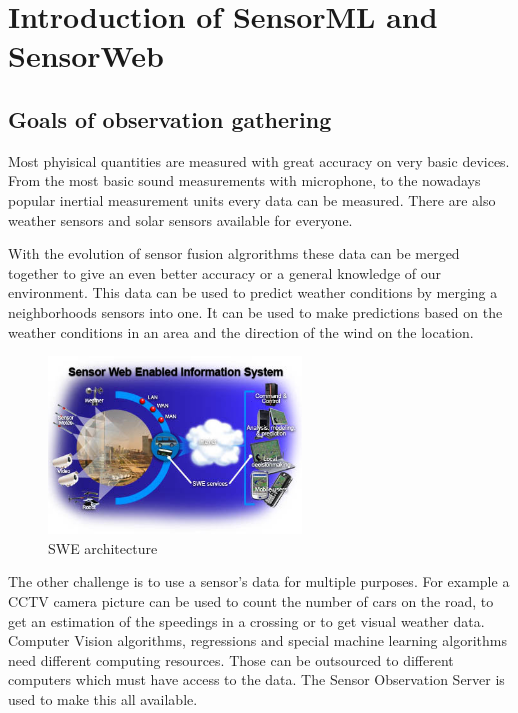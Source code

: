 \chapter{Introduction of SensorML and SensorWeb}\label{sect:Introduction}
\section{Goals of observation gathering}
Most phyisical quantities are measured with great accuracy on very basic devices. From the most basic sound measurements with microphone, to the nowadays popular inertial measurement units every data can be measured. There are also weather sensors and solar sensors available for everyone.

 With the evolution of sensor fusion algrorithms these data can be merged together to give an even better accuracy or a general knowledge of our environment. This data can be used to predict weather conditions by merging a neighborhoods sensors into one. It can be used to make predictions based on the weather conditions in an area and the direction of the wind on the location.
 
 \begin{figure}[h]
 \centering
  \includegraphics[width=0.6\textwidth]{figures/webswe.png}
 \caption{SWE architecture\label{fig:webswe}}
 \end{figure}
 
 
 The other challenge is to use a sensor's data for multiple purposes. For example a CCTV camera picture can be used to count the number of cars on the road, to get an estimation of the speedings in a crossing or to get visual weather data. Computer Vision algorithms, regressions and special machine learning algorithms need different computing resources. Those can be outsourced to different computers which must have access to the data. The Sensor Observation Server is used to make this all available.
 
